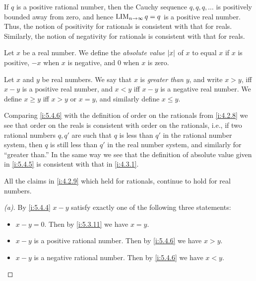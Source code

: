 \begin{note}
  If \(q\) is a positive rational number, then the Cauchy sequence \(q, q, q, \dots\) is positively bounded away from zero, and hence \(\operatorname*{LIM}_{n \to \infty} q = q\) is a positive real number.
  Thus, the notion of positivity for rationals is consistent with that for reals.
  Similarly, the notion of negativity for rationals is consistent with that for reals.
\end{note}

\begin{defn}\label{i:5.4.5}
  Let \(x\) be a real number.
  We define the \emph{absolute value} \(\left\lvert x\right\rvert\) of \(x\) to equal \(x\) if \(x\) is positive, \(-x\) when \(x\) is negative, and \(0\) when \(x\) is zero.
\end{defn}

\begin{defn}\label{i:5.4.6}
  Let \(x\) and \(y\) be real numbers.
  We say that \(x\) is \emph{greater than} \(y\), and write \(x > y\), iff \(x - y\) is a positive real number, and \(x < y\) iff \(x - y\) is a negative real number.
  We define \(x \geq y\) iff \(x > y\) or \(x = y\), and similarly define \(x \leq y\).
\end{defn}

\begin{note}
  Comparing \cref{i:5.4.6} with the definition of order on the rationals from \cref{i:4.2.8} we see that order on the reals is consistent with order on the rationals, i.e., if two rational numbers \(q, q'\) are such that \(q\) is less than \(q'\) in the rational number system, then \(q\) is still less than \(q'\) in the real number system, and similarly for ``greater than.''
  In the same way we see that the definition of absolute value given in \cref{i:5.4.5} is consistent with that in \cref{i:4.3.1}.
\end{note}

\begin{prop}\label{i:5.4.7}
  All the claims in \cref{i:4.2.9} which held for rationals, continue to hold for real numbers.
\end{prop}

\begin{proof}[(a)]
  By \cref{i:5.4.4} \(x - y\) satisfy exactly one of the following three statements:
  \begin{itemize}
    \item \(x - y = 0\).
          Then by \cref{i:5.3.11} we have \(x = y\).
    \item \(x - y\) is a positive rational number.
          Then by \cref{i:5.4.6} we have \(x > y\).
    \item \(x - y\) is a negative rational number.
          Then by \cref{i:5.4.6} we have \(x < y\).
  \end{itemize}
\end{proof}

